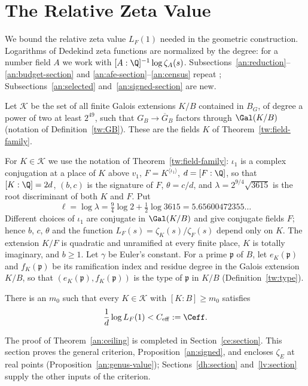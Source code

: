 \section{The Relative Zeta Value}\label{an:section}

We bound the relative zeta value $L_F(1)$ needed in the geometric
construction. Logarithms of Dedekind zeta functions are normalized by the
degree: for a number field $A$ we work with $[A:\Q]^{-1}\log\zeta_A(s)$.
Subsections~\ref{an:reduction}--\ref{an:budget-section} and
\ref{an:afe-section}--\ref{an:census} repeat \cite[Section~4]{Naslund04273};
Subsections~\ref{an:selected} and~\ref{an:signed-section} are new.

\begin{definition}\label{an:family}
Let $\mathcal K$ be the set of all finite Galois extensions $K/B$ contained
in $B_G$, of degree a power of two at least $2^{49}$, such that
$G_B\to\overline G_B$ factors through $\Gal(K/B)$ (notation of
Definition~\ref{tw:GB}). These are the fields $K$ of
Theorem~\ref{tw:field-family}.
\end{definition}

For $K\in\mathcal K$ we use the notation of
Theorem~\ref{tw:field-family}: $\iota_1$ is a complex conjugation at a place of $K$ above
$v_1$, $F=K^{\langle\iota_1\rangle}$, $d=[F:\Q]$, so that $[K:\Q]=2d$, $(b,c)$
is the signature of $F$, $\theta=c/d$, and $\lambda=2^{9/4}\sqrt{3615}$ is the
root discriminant of both $K$ and $F$. Put
\[
 \ell=\log\lambda=\tfrac94\log2+\tfrac12\log3615=5.65600472355\ldots
\]
Different choices of $\iota_1$ are conjugate in $\Gal(K/B)$ and give
conjugate fields $F$; hence $b$, $c$, $\theta$ and the function
$L_F(s)=\zeta_K(s)/\zeta_F(s)$ depend only on $K$. The extension $K/F$ is
quadratic and unramified at every finite place, $K$ is totally imaginary,
and $b\ge1$. Let $\gamma$ be Euler's constant. For a
prime $\mathfrak p$ of $B$, let $e_K(\mathfrak p)$ and $f_K(\mathfrak p)$ be
its ramification index and residue degree in the Galois extension $K/B$, so
that $(e_K(\mathfrak p),f_K(\mathfrak p))$ is the type of $\mathfrak p$ in
$K/B$ (Definition~\ref{tw:type}).


\begin{theorem}\label{an:ceiling}
There is an $m_0$ such that every $K\in\mathcal K$ with $[K:B]\ge m_0$
satisfies
\[
 \frac1d\log L_F(1)<C_{\rm eff}:=\Ceff.
\]
\end{theorem}

The proof of Theorem~\ref{an:ceiling} is completed in
Section~\ref{ce:section}. This section proves the general criterion,
Proposition~\ref{an:signed}, and encloses $\zeta_E$ at real points
(Proposition~\ref{an:genus-value}); Sections~\ref{dh:section}
and~\ref{lv:section} supply the other inputs of the criterion.

